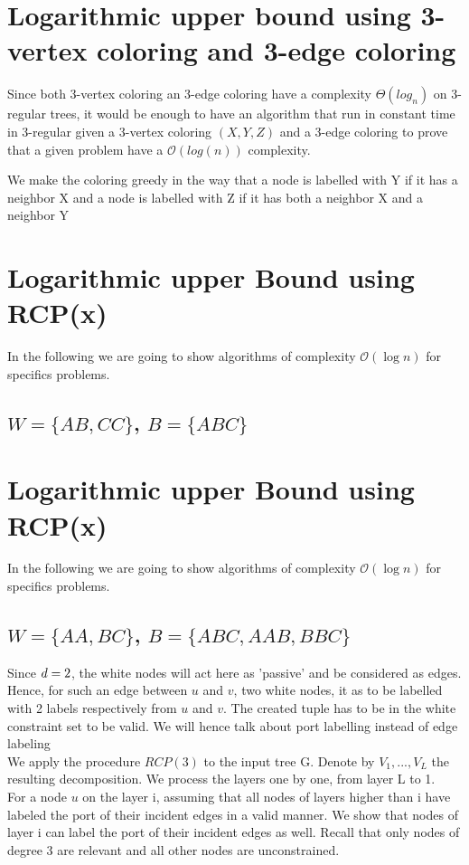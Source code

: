 \section{Logarithmic upper bound using 3-vertex coloring and 3-edge coloring}
Since both 3-vertex coloring an 3-edge coloring have a complexity $\Theta(log_n)$ on 3-regular trees, it would be enough to have an algorithm that run in constant time in 3-regular given a 3-vertex coloring $(X,Y,Z)$ and a 3-edge coloring to prove that a given problem have a $\mathcal{O}(log(n))$ complexity.

We make the coloring greedy in the way that a node is labelled with Y if it has a neighbor X and a node is labelled with Z if it has both a neighbor X and a neighbor Y


\section{Logarithmic upper Bound using RCP(x)}
In the following we are going to show algorithms of complexity $\mathcal{O}(\log{}n)$ for specifics problems.\\
\subsection{$W = \{AB,CC\}$, $B = \{ABC\}$}

\section{Logarithmic upper Bound using RCP(x)}
In the following we are going to show algorithms of complexity $\mathcal{O}(\log{}n)$ for specifics problems.\\
\subsection{$W = \{AA,BC\}$, $B = \{ABC,AAB,BBC\}$}

Since $d = 2$, the white nodes will act here as 'passive' and be considered as edges. Hence, for such an edge between $u$ and $v$, two white nodes, it as to be labelled with 2 labels respectively from $u$ and $v$. The created tuple has to be in the white constraint set to be valid. We will hence talk about port labelling instead of edge labeling\\

We apply the procedure $RCP(3)$ to the input tree G. Denote by $V_1, . . . , V_L$ the resulting decomposition. We process the layers one by one, from layer L to 1.\\
For a node $u$ on the layer i, assuming that all nodes of layers higher than i have labeled the port of their incident edges in a valid manner. We show that nodes of layer i can label the port of their incident edges as well. Recall that only nodes of degree 3 are relevant and all other nodes are unconstrained.\\

